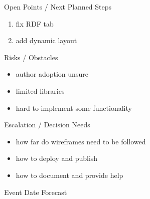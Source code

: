 \documentclass[]{kiesgrube}
\begin{document}
\begin{poster}
\begin{posterbox}[name=open,column=1,below=description]{Open Points / Next Planned Steps}
\begin{enumerate}
\item fix RDF tab 
\item add dynamic layout 
\end{enumerate}
\end{posterbox}
\begin{posterbox}[name=risks,column=1,below=open]{Risks / Obstacles}
\begin{itemize}
\item author adoption unsure
\item limited libraries
\item hard to implement some functionality 
\end{itemize}
\end{posterbox}
\begin{posterbox}[name=escalation,column=1,below=risks]{Escalation / Decision Needs}
\begin{itemize}
\item how far do wireframes need to be followed 
\item how to deploy and publish
\item how to document and provide help 
\end{itemize}
\end{posterbox}
\begin{posterbox}[name=event,below=progress,]{Event Date Forecast}
\end{posterbox}


\end{poster}
\end{document}
